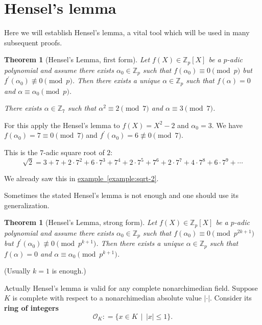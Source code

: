 \documentclass{article}
\newcommand{\term}{\textbf}
\newcommand{\dfn}{\mathrel{\mathop:}=}
\newcommand{\ZZ}{\mathbb{Z}}
\renewcommand{\O}{\mathcal{O}}
\newcommand{\refref}[2]{\hyperref[#2]{#1~\ref*{#2}}}
\newcommand{\examplesymbol}{$\blacktriangle$}
\renewcommand{\qedsymbol}{$\blacksquare$}
\theoremstyle{myplain}
\newtheorem{theorem}[proposition]{Theorem}
\theoremstyle{mydefinition}
\newenvironment{example}
  {\pushQED{\qed}\renewcommand{\qedsymbol}{\examplesymbol}\examplex}
  {\popQED\endexamplex}
\begin{document}
\section{Hensel's lemma}

Here we will establish Hensel's lemma, a vital tool which will be used in many
subsequent proofs.

\begin{theorem}[Hensel's Lemma, first form]\label{theorem:Hensel-first}
  Let $f (X) \in \ZZ_p [X]$ be a $p$-adic polynomial and assume there exists
  $\alpha_0 \in \ZZ_p$ such that $f (\alpha_0) \equiv 0 \pmod{p}$ but
  $f^\prime (\alpha_0) \not\equiv 0 \pmod{p}$. Then there exists a unique
  $\alpha \in \ZZ_p$ such that $f (\alpha) = 0$ and
  $\alpha \equiv \alpha_0 \pmod{p}$.
\end{theorem}

\begin{example}
  \emph{There exists $\alpha \in \ZZ_7$ such that $\alpha^2 \equiv 2 \pmod{7}$
    and $\alpha \equiv 3 \pmod{7}$.}

  For this apply the Hensel's lemma to $f (X) = X^2 - 2$ and $\alpha_0 = 3$.
  We have $f (\alpha_0) = 7 \equiv 0 \pmod{7}$ and
  $f^\prime (\alpha_0) = 6 \not\equiv 0 \pmod{7}$.

  This is the $7$-adic square root of $2$:
  $$\sqrt{2} = 3 + 7 + 2\cdot 7^2 + 6\cdot 7^3 + 7^4 + 2\cdot 7^5 + 7^6 + 2\cdot 7^7 + 4\cdot 7^8 + 6\cdot 7^9 + \cdots$$

  We already saw this in \refref{example}{example:sqrt-2}.
\end{example}

Sometimes the stated Hensel's lemma is not enough and one should use its
generalization.

\begin{theorem}[Hensel's Lemma, strong form]\label{theorem:Hensel-strong}
  Let $f (X) \in \ZZ_p [X]$ be a $p$-adic polynomial and assume there exists
  $\alpha_0 \in \ZZ_p$ such that $f (\alpha_0) \equiv 0 \pmod{p^{2k+1}}$ but
  $f^\prime (\alpha_0) \not\equiv 0 \pmod{p^{k+1}}$. Then there exists a unique
  $\alpha \in \ZZ_p$ such that $f (\alpha) = 0$ and
  $\alpha \equiv \alpha_0 \pmod{p^{k+1}}$.
\end{theorem}

\noindent (Usually $k = 1$ is enough.)

\vspace{1em}

Actually Hensel's lemma is valid for any complete nonarchimedian field. Suppose
$K$ is complete with respect to a nonarchimedian absolute value
$|\cdot|$. Consider its \term{ring of integers}
$$\O_K \dfn \{ x \in K \,\mid\, |x| \le 1 \}.$$
\end{document}

